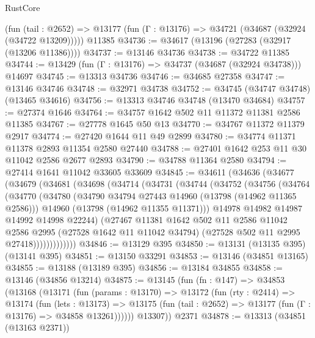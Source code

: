\begin{lexlean}{RustCore}
\begin{coremodule}
    (fun (tail : @2652) => @13177 (fun (Γ : @13176) => @34721 (@34687 (@32924 (@34722 @13209)))))
    @11385
@34736 := @34617 (@13196 (@27283 (@32917 (@13206 @11386))))
@34737 := @13146 @34736
@34738 := @34722 @11385
@34744 := @13429 (fun (Γ : @13176) => @34737 (@34687 (@32924 @34738))) @14697
@34745 := @13313 @34736
@34746 := @34685 @27358
@34747 := @13146 @34746
@34748 := @32971 @34738
@34752 := @34745 (@34747 @34748) (@13465 @34616)
@34756 := @13313 @34746 @34748 (@13470 @34684)
@34757 := @27374 @1646
@34764 := @34757 @1642 @502 @11 @11372 @11381 @2586 @11385
@34767 := @27778 @1645 @50 @13
@34770 := @34767 @11372 @11379 @2917
@34774 := @27420 @1644 @11 @49 @2899
@34780 := @34774 @11371 @11378 @2893 @11354 @2580 @27440
@34788 := @27401 @1642 @253 @11 @30 @11042 @2586 @2677 @2893
@34790 := @34788 @11364 @2580
@34794 := @27414 @1641 @11042 @33605 @33609
@34845 := @34611
    (@34636
      (@34677
        (@34679
          (@34681
            (@34698
              (@34714
                (@34731
                  (@34744
                    (@34752
                      (@34756
                        (@34764
                          (@34770
                            (@34780
                              (@34790 @34794 @27443 @14960 (@13798 (@14962 @11365 @2586)))
                              @14960
                              (@13798 (@14962 @11355 @11371)))
                            @14978
                            @14982
                            @14987
                            @14992
                            @14998
                            @22244)
                          (@27467
                            @11381
                            @1642
                            @502
                            @11
                            @2586
                            @11042
                            @2586
                            @2995
                            (@27528 @1642 @11 @11042 @34794)
                            (@27528 @502 @11 @2995 @27418)))))))))))))
@34846 := @13129 @395
@34850 := @13131 (@13135 @395) (@13141 @395)
@34851 := @13150 @33291
@34853 := @13146 (@34851 @13165)
@34855 := @13188 (@13189 @395)
@34856 := @13184 @34855
@34858 := @13146 (@34856 @13214)
@34875 := @13145
    (fun (fn : @147) =>
    @34853
      (@13168
        (@13171
          (fun (params : @13170) =>
          @13172
            (fun (rty : @2414) =>
            @13174
              (fun (lets : @13173) =>
              @13175 (fun (tail : @2652) => @13177 (fun (Γ : @13176) => @34858 @13261))))))
        @13307))
    @2371
@34878 := @13313 (@34851 (@13163 @2371))

\end{coremodule}
\end{lexlean}
